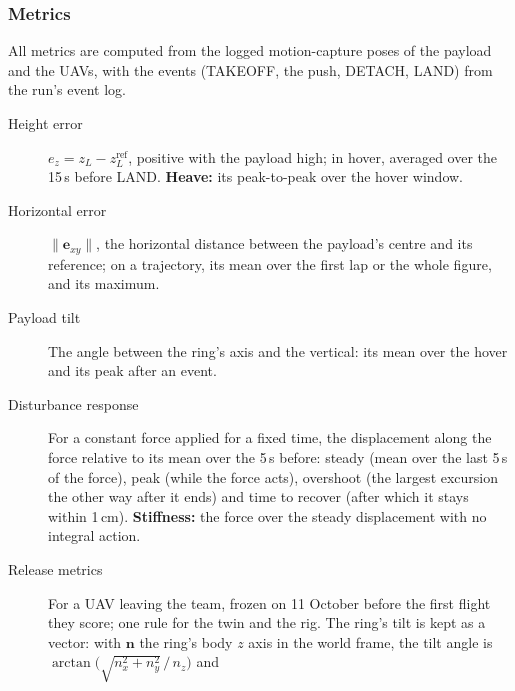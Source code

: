 
\subsubsection{Metrics}
\label{sec:metrics}

All metrics are computed from the logged motion-capture poses of the payload and the UAVs, with the
events (TAKEOFF, the push, DETACH, LAND) from the run's event log.
\begin{description}
    \item[Height error] $e_z = z_L - z_L^{\mathrm{ref}}$, positive with the payload high; in hover, averaged
    over the 15\,s before LAND. \textbf{Heave:} its peak-to-peak over the hover window.
    \item[Horizontal error] $\|\mathbf{e}_{xy}\|$, the horizontal distance between the payload's centre and
    its reference; on a trajectory, its mean over the first lap or the whole figure, and its maximum.
    \item[Payload tilt] The angle between the ring's axis and the vertical: its mean over the hover and its
    peak after an event.
    \item[Disturbance response] For a constant force applied for a fixed time, the displacement along the
    force relative to its mean over the 5\,s before: steady (mean over the last 5\,s of the force), peak
    (while the force acts), overshoot (the largest excursion the other way after it ends) and time to
    recover (after which it stays within 1\,cm). \textbf{Stiffness:} the force over the steady displacement
    with no integral action.
    \item[Release metrics] For a UAV leaving the team, frozen on 11 October before the first flight they
    score; one rule for the twin and the rig. The ring's tilt is kept as a vector: with $\mathbf{n}$ the ring's
    body $z$ axis in the world frame, the tilt angle is $\arctan\!\big(\sqrt{n_x^2+n_y^2}\,/\,n_z\big)$ and

\end{description}
